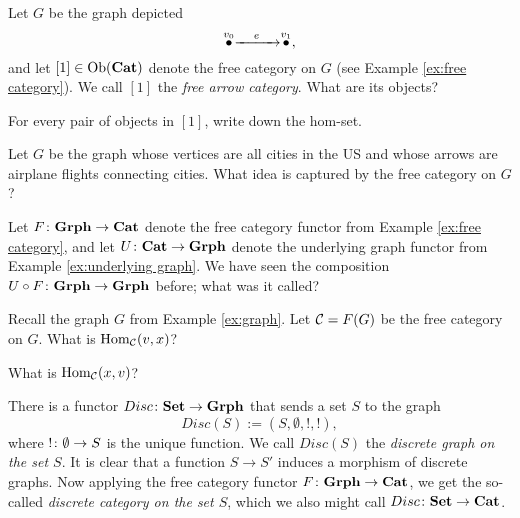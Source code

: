 \documentclass[CT4S-EN-RU]{subfiles}
\begin{document}
\begin{exerciseENG}\label{exc:[1]}
Let $G$ be the graph depicted $$\stackrel{v_0}{\bullet}\xrightarrow{\ \ \;\;e\;\;\ \ }\stackrel{v_1}{\bullet},$$ and let $[1]\in\textnormal{Ob}({\bf Cat})$ denote the free category on $G$ (see Example \ref{ex:free category}). We call $[1]$ the {\em free arrow category}.
\sexc What are its objects?
\item For every pair of objects in $[1]$, write down the hom-set.
\endsexc
\end{exerciseENG}

\begin{exerciseRUS}\label{exc:[1]}
\end{exerciseRUS}

\begin{exerciseENG}
Let $G$ be the graph whose vertices are all cities in the US and whose arrows are airplane flights connecting cities. What idea is captured by the free category on $G$?
\end{exerciseENG}

\begin{exerciseRUS}
\end{exerciseRUS}

\begin{exerciseENG}\label{exc:free underlying cat grph}
Let $F\colon{\bf Grph}\rightarrow{\bf Cat}$ denote the free category functor from Example \ref{ex:free category}, and let $U\colon{\bf Cat}\rightarrow{\bf Grph}$ denote the underlying graph functor from Example \ref{ex:underlying graph}. We have seen the composition $U\circ F\colon{\bf Grph}\rightarrow{\bf Grph}$ before; what was it called?
\end{exerciseENG}

\begin{exerciseRUS}\label{exc:free underlying cat grph}
\end{exerciseRUS}

\begin{exerciseENG}
Recall the graph $G$ from Example \ref{ex:graph}. Let $\mathcal{C}=F(G)$ be the free category on $G$.
\sexc What is $\textnormal{Hom}_\mathcal{C}(v,x)$?
\item What is $\textnormal{Hom}_\mathcal{C}(x,v)$?
\endsexc
\end{exerciseENG}

\begin{exerciseRUS}
\end{exerciseRUS}

\begin{exampleENG}\label{ex:discrete graph discrete cat}
There is a functor $Disc\colon{\bf Set}\rightarrow{\bf Grph}$ that sends a set $S$ to the graph $$Disc(S):=(S,\emptyset,!,!),$$ where $!\colon\emptyset\rightarrow S$ is the unique function. We call $Disc(S)$ the {\em discrete graph on the set $S$}. It is clear that a function $S\to S'$ induces a morphism of discrete graphs. Now applying the free category functor $F\colon{\bf Grph}\rightarrow{\bf Cat}$, we get the so-called {\em discrete category on the set $S$}, which we also might call $Disc\colon{\bf Set}\rightarrow{\bf Cat}$. 
\end{exampleENG}
\end{document}
